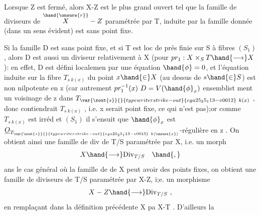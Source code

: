 
 Lorsque Z est fermé, alors X-Z est le plus grand ouvert
tel que la famille de diviseurs de $\overset{\hand{\unsure{r}}}{X}-Z$ paramétrée par T, induite par la
famille donnée (dans un sens évident) est sans point fixe.

Si la famille D est sans point fixe, et si T est  loc de prés finie
sur S à fibres $(S_1)$, alors D est aussi un diviseur 
relativement à X (pour $pr_1 : X\times_S T \hand{\longrightarrow} X$): en effet, D est défini localemen
 par une équation  $\hand{\phi} = 0$, et l'équation induite sur la fibre
$T_{s\ k(x)}$ du point $x\hand{\in} X$ (au dessus de $s\hand{\in} S$) est non 
nilpotente en z (car autrement $pr_1^{-1}(x)\ D = V(\hand{\phi}_x)$   ensemblist
ment un voisinage de z dans $T_{\var{\xout{s}}{}{typewriter strike-out}{ega25_25_113-v0012}\ k(x)}$ , donc contiendrait $T_{s\ k(x)}$ , i.e.
x serait point fixe, ce qui n'est pas);or comme $T_{s\ k(x)}$ est irréd et $(S_1)$
il s'ensuit que $\hand{\phi}_x$ est $\underline{O}_{T_{\var{\xout{s}}{}{typewriter strike-out}{ega25_25_113-v0013}\ k(\unsure{x})}}$-régulière en z . On obtient ainsi
 une famille de div de T/S paramétrée par X, i.e. un morph
\[ X \hand{\longrightarrow} \mathrm{Div}_{T/S} \quad \hand{,} \]
ans le cas général où la famille de  de X peut avoir des points
fixes, on obtient une famille de diviseurs de T/S paramétrée par X-Z,
i;e. un morphisme
\[ X - Z \hand{\longrightarrow} \mathrm{Div}_{T/S} \ , \]
en remplaçant dans la définition précédente X pa X-T . D'ailleurs la

